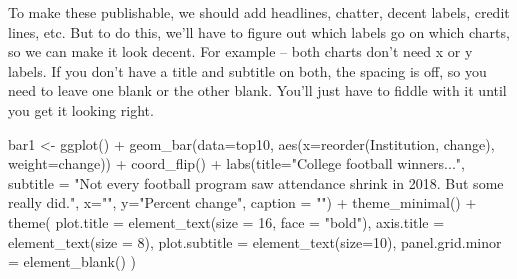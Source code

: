 \documentclass[
]{book}
\newenvironment{Shaded}{\begin{snugshade}}{\end{snugshade}}
\newcommand{\AttributeTok}[1]{\textcolor[rgb]{0.77,0.63,0.00}{#1}}
\newcommand{\DecValTok}[1]{\textcolor[rgb]{0.00,0.00,0.81}{#1}}
\newcommand{\FunctionTok}[1]{\textcolor[rgb]{0.00,0.00,0.00}{#1}}
\newcommand{\NormalTok}[1]{#1}
\newcommand{\OtherTok}[1]{\textcolor[rgb]{0.56,0.35,0.01}{#1}}
\newcommand{\SpecialCharTok}[1]{\textcolor[rgb]{0.00,0.00,0.00}{#1}}
\newcommand{\StringTok}[1]{\textcolor[rgb]{0.31,0.60,0.02}{#1}}
\begin{document}
To make these publishable, we should add headlines, chatter, decent labels, credit lines, etc. But to do this, we'll have to figure out which labels go on which charts, so we can make it look decent. For example -- both charts don't need x or y labels. If you don't have a title and subtitle on both, the spacing is off, so you need to leave one blank or the other blank. You'll just have to fiddle with it until you get it looking right.

\begin{Shaded}
\begin{Highlighting}[]
\NormalTok{bar1 }\OtherTok{\textless{}{-}} \FunctionTok{ggplot}\NormalTok{() }\SpecialCharTok{+} \FunctionTok{geom\_bar}\NormalTok{(}\AttributeTok{data=}\NormalTok{top10, }\FunctionTok{aes}\NormalTok{(}\AttributeTok{x=}\FunctionTok{reorder}\NormalTok{(Institution, change), }\AttributeTok{weight=}\NormalTok{change)) }\SpecialCharTok{+} \FunctionTok{coord\_flip}\NormalTok{() }\SpecialCharTok{+} \FunctionTok{labs}\NormalTok{(}\AttributeTok{title=}\StringTok{"College football winners..."}\NormalTok{, }\AttributeTok{subtitle =} \StringTok{"Not every football program saw attendance shrink in 2018. But some really did."}\NormalTok{,  }\AttributeTok{x=}\StringTok{""}\NormalTok{, }\AttributeTok{y=}\StringTok{"Percent change"}\NormalTok{, }\AttributeTok{caption =} \StringTok{""}\NormalTok{) }\SpecialCharTok{+} \FunctionTok{theme\_minimal}\NormalTok{() }\SpecialCharTok{+} 
  \FunctionTok{theme}\NormalTok{(}
    \AttributeTok{plot.title =} \FunctionTok{element\_text}\NormalTok{(}\AttributeTok{size =} \DecValTok{16}\NormalTok{, }\AttributeTok{face =} \StringTok{"bold"}\NormalTok{),}
    \AttributeTok{axis.title =} \FunctionTok{element\_text}\NormalTok{(}\AttributeTok{size =} \DecValTok{8}\NormalTok{), }
    \AttributeTok{plot.subtitle =} \FunctionTok{element\_text}\NormalTok{(}\AttributeTok{size=}\DecValTok{10}\NormalTok{), }
    \AttributeTok{panel.grid.minor =} \FunctionTok{element\_blank}\NormalTok{()}
\NormalTok{    )}
\end{Highlighting}
\end{Shaded}
\end{document}
